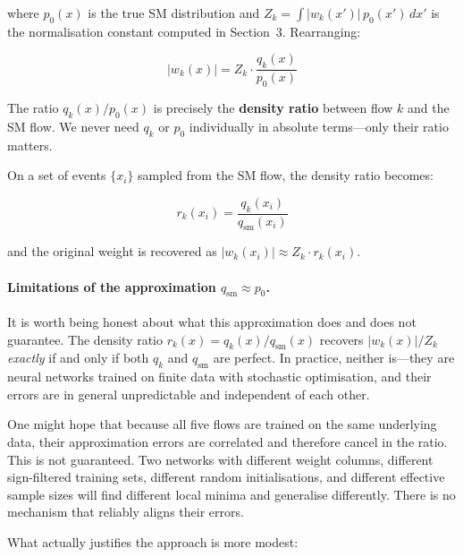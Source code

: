 \documentclass[11pt,a4paper]{article}
\begin{document}
where $p_0(x)$ is the true SM distribution and $Z_k = \int |w_k(x')|\,p_0(x')\,dx'$ is the
normalisation constant computed in Section~3.  Rearranging:

\begin{equation}
  |w_k(x)| = Z_k \cdot \frac{q_k(x)}{p_0(x)}
\end{equation}

The ratio $q_k(x)/p_0(x)$ is precisely the \textbf{density ratio} between flow $k$ and the SM flow.
We never need $q_k$ or $p_0$ individually in absolute terms---only their ratio matters.

On a set of events $\{x_i\}$ sampled from the SM flow, the density ratio becomes:

\begin{equation}
  r_k(x_i) = \frac{q_k(x_i)}{q_{\text{sm}}(x_i)}
\end{equation}

and the original weight is recovered as $|w_k(x_i)| \approx Z_k \cdot r_k(x_i)$.

\paragraph{Limitations of the approximation $q_{\text{sm}} \approx p_0$.}

It is worth being honest about what this approximation does and does not guarantee.  The density 
ratio $r_k(x) = q_k(x)/q_{\text{sm}}(x)$ recovers $|w_k(x)|/Z_k$ \emph{exactly} if and only if 
both $q_k$ and $q_{\text{sm}}$ are perfect.  In practice, neither is---they are neural networks 
trained on finite data with stochastic optimisation, and their errors are in general unpredictable 
and independent of each other.

One might hope that because all five flows are trained on the same underlying data, their 
approximation errors are correlated and therefore cancel in the ratio.  This is not guaranteed.  
Two networks with different weight columns, different sign-filtered training sets, different random 
initialisations, and different effective sample sizes will find different local minima and generalise 
differently.  There is no mechanism that reliably aligns their errors.

What actually justifies the approach is more modest:
\end{document}
